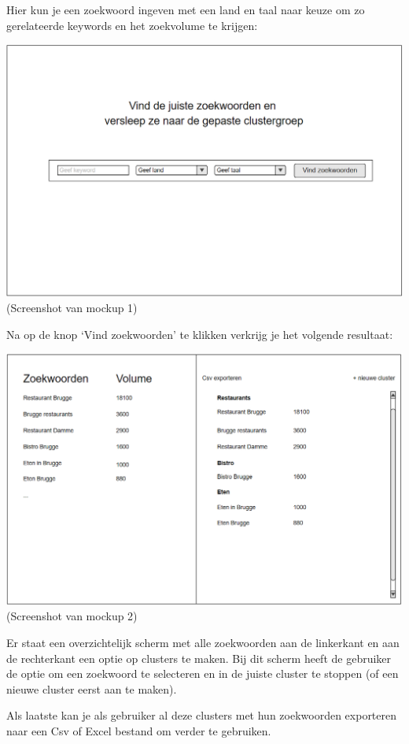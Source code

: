 Hier kun je een zoekwoord ingeven met een land en taal naar keuze om zo gerelateerde keywords en het zoekvolume te krijgen: 

\includegraphics[width=\linewidth]{Bachelorproef/bachelor/img/Mockup.png}
(Screenshot van mockup 1)

Na op de knop ‘Vind zoekwoorden’ te klikken verkrijg je het volgende resultaat: 

\includegraphics[width=\linewidth]{Bachelorproef/bachelor/img/Mockup2.png}
(Screenshot van mockup 2)

Er staat een overzichtelijk scherm met alle zoekwoorden aan de linkerkant en aan de rechterkant een optie op clusters te maken. Bij dit scherm heeft de gebruiker de optie om een zoekwoord te selecteren en in de juiste cluster te stoppen (of een nieuwe cluster eerst aan te maken). 

Als laatste kan je als gebruiker al deze clusters met hun zoekwoorden exporteren naar een Csv of Excel bestand om verder te gebruiken. 

